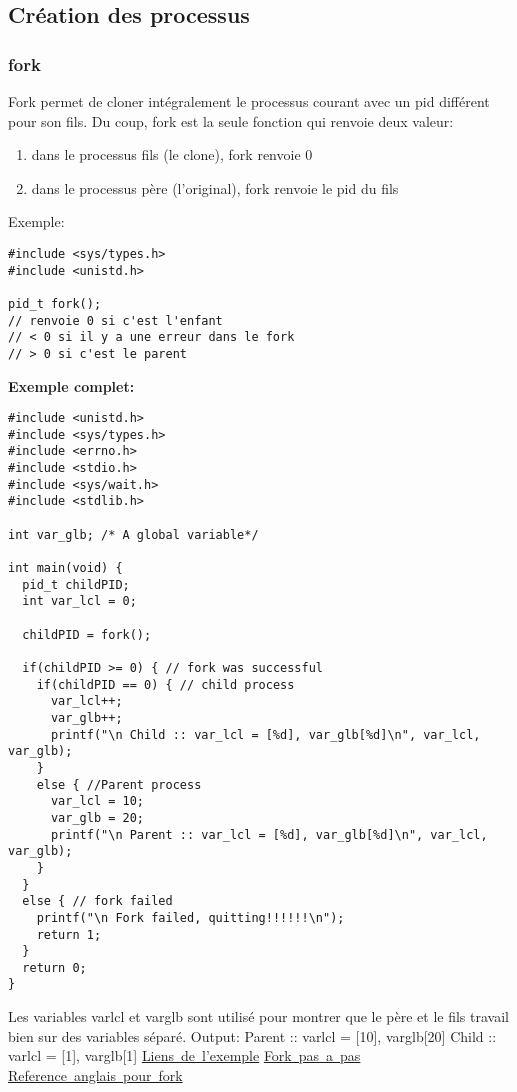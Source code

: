 \documentclass[a4paper]{article}
\begin{document}
\subsection{Création des processus}
\subsubsection{fork}
Fork permet de cloner intégralement le processus courant avec un pid différent pour son fils.
Du coup, fork est la seule fonction qui renvoie deux valeur:
\begin{enumerate}
  \item dans le processus fils (le clone), fork renvoie 0
  \item dans le processus père (l'original), fork renvoie le pid du fils
\end{enumerate}
Exemple:
\begin{lstlisting}
#include <sys/types.h>
#include <unistd.h>

pid_t fork();
// renvoie 0 si c'est l'enfant
// < 0 si il y a une erreur dans le fork
// > 0 si c'est le parent
\end{lstlisting}
\newpage
\textbf{Exemple complet:}
\begin{lstlisting}
#include <unistd.h>
#include <sys/types.h>
#include <errno.h>
#include <stdio.h>
#include <sys/wait.h>
#include <stdlib.h>

int var_glb; /* A global variable*/

int main(void) {
  pid_t childPID;
  int var_lcl = 0;

  childPID = fork();

  if(childPID >= 0) { // fork was successful
    if(childPID == 0) { // child process
      var_lcl++;
      var_glb++;
      printf("\n Child :: var_lcl = [%d], var_glb[%d]\n", var_lcl, var_glb);
    }
    else { //Parent process
      var_lcl = 10;
      var_glb = 20;
      printf("\n Parent :: var_lcl = [%d], var_glb[%d]\n", var_lcl, var_glb);
    }
  }
  else { // fork failed
    printf("\n Fork failed, quitting!!!!!!\n");
    return 1;
  }
  return 0;
}
\end{lstlisting}
Les variables var\textunderscore{}lcl et var\textunderscore{}glb sont utilisé pour montrer que le père et le fils travail bien sur des variables séparé.\newline
Output:\newline
Parent :: var\textunderscore{}lcl = [10], var\textunderscore{}glb[20]\newline
Child :: var\textunderscore{}lcl = [1], var\textunderscore{}glb[1]\newline
\href{https://www.thegeekstuff.com/2012/05/c-fork-function/}{Liens~de~l'exemple}\newline
\href{http://www.commentcamarche.net/faq/10611-que-fait-un-fork}{Fork~pas~a~pas}\newline
\href{http://pubs.opengroup.org/onlinepubs/9699919799/functions/fork.html#}{Reference~anglais~pour~fork}\newline
\end{document}
